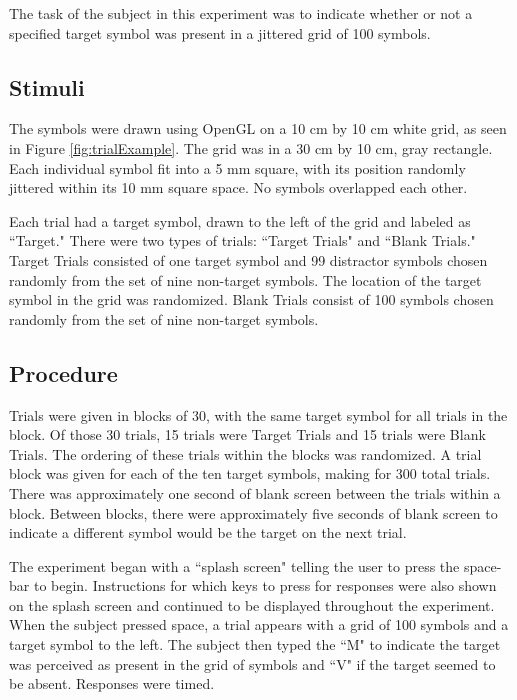 \documentclass{article} %
\begin{document}
The task of the subject in this experiment was to indicate whether or not a specified target symbol was present in a jittered grid of 100 symbols.

\subsection{Stimuli}

The symbols were drawn using OpenGL on a 10 cm by 10 cm white grid, as seen in Figure \ref{fig:trialExample}.  The grid was in a 30 cm by 10 cm, gray rectangle.  Each individual symbol fit into a 5 mm square, with its position randomly jittered within its 10 mm square space.  No symbols overlapped each other.

Each trial had a target symbol, drawn to the left of the grid and labeled as ``Target."  There were two types of trials: ``Target Trials" and ``Blank Trials."  Target Trials consisted of one target symbol and 99 distractor symbols chosen randomly from the set of nine non-target symbols.  The location of the target symbol in the grid was randomized.  Blank Trials consist of 100 symbols chosen randomly from the set of nine non-target symbols.

\subsection{Procedure}

Trials were given in blocks of 30, with the same target symbol for all trials in the block.  Of those 30 trials, 15 trials were Target Trials and 15 trials were Blank Trials.  The ordering of these trials within the blocks was randomized.  A trial block was given for each of the ten target symbols, making for 300 total trials.  There was approximately one second of blank screen between the trials within a block.  Between blocks, there were approximately five seconds of blank screen to indicate a different symbol would be the target on the next trial.

The experiment began with a ``splash screen" telling the user to press the space-bar to begin.  Instructions for which keys to press for responses were also shown on the splash screen and continued to be displayed throughout the experiment.  When the subject pressed space, a trial appears with a grid of 100 symbols and a target symbol to the left.  The subject then typed the ``M" to indicate the target was perceived as present in the grid of symbols and ``V" if the target seemed to be absent.  Responses were timed.
\end{document}
